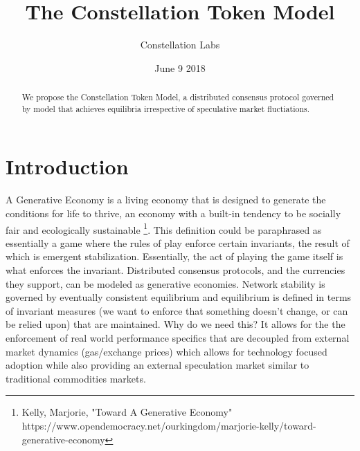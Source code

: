 \documentclass{article}
\title{The Constellation Token Model}
\author{Constellation Labs}
\date{June 9 2018}
\begin{document}
\maketitle

\begin{abstract}
We propose the Constellation Token Model, a distributed consensus protocol governed by model that achieves equilibria irrespective of speculative market fluctiations.
\end{abstract}
\setcounter{secnumdepth}{0}
\section{Introduction}
A Generative Economy is a living economy that is designed to generate the conditions for life to thrive, an economy with a built-in tendency to be socially fair and ecologically sustainable \footnote{Kelly, Marjorie, "Toward A Generative Economy" https://www.opendemocracy.net/ourkingdom/marjorie-kelly/toward-generative-economy}. This definition could be paraphrased as essentially a game where the rules of play enforce certain invariants, the result of which is emergent stabilization. Essentially, the act of playing the game itself is what enforces the invariant. Distributed consensus protocols, and the currencies they support, can be modeled as generative economies. Network stability is governed by eventually consistent equilibrium and equilibrium is defined in terms of invariant measures (we want to enforce that something doesn't change, or can be relied upon) that are maintained. Why do we need this? It allows for the the enforcement of real world performance specifics that are decoupled from external market dynamics (gas/exchange prices) which allows for technology focused adoption while also providing an external speculation market similar to traditional commodities markets.
\end{document}
